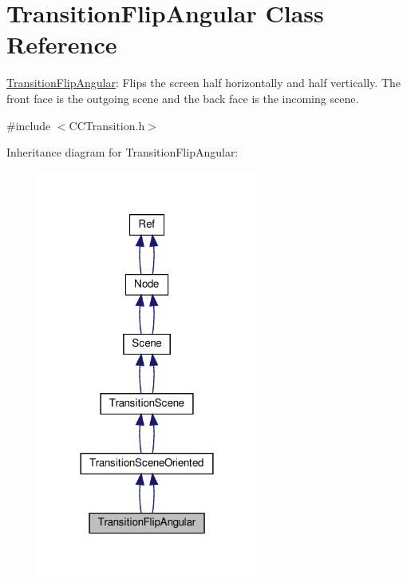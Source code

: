 \hypertarget{classTransitionFlipAngular}{}\section{Transition\+Flip\+Angular Class Reference}
\label{classTransitionFlipAngular}


\hyperlink{classTransitionFlipAngular}{Transition\+Flip\+Angular}\+: Flips the screen half horizontally and half vertically. The front face is the outgoing scene and the back face is the incoming scene.  




{\ttfamily \#include $<$C\+C\+Transition.\+h$>$}



Inheritance diagram for Transition\+Flip\+Angular\+:
\nopagebreak
\begin{figure}[H]
\begin{center}
\leavevmode
\includegraphics[width=204pt]{classTransitionFlipAngular__inherit__graph}
\end{center}
\end{figure}


